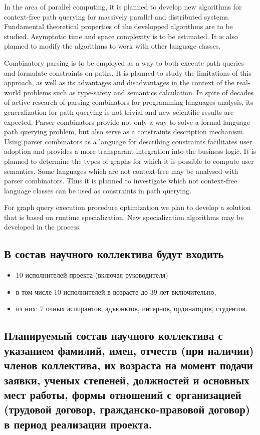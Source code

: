 \documentclass[12pt]{article}  %
\theoremstyle{remark}
\begin{document}
In the area of parallel computing, it is planned to develop new algorithms for context-free path querying for massively parallel and distributed systems.
Fundamental theoretical properties of the developped algorithms are to be studied.
Asymptotic time and space complexity is to be estimated.
It is also planned to modify the algorithms to work with other language classes.

Combinatory parsing is to be employed as a way to both execute path queries and formulate constraints on paths.
It is planned to study the limitations of this approach, as well as its advantages and disadvantages in the context of the real-world problems such as type-safety and semantics calculation.
In spite of decades of active research of parsing combinators for programming languages analysis, its generalization for path querying is not trivial and new scientific results are expected.
Parser combinators provide not only a way to solve a formal language path querying problem, but also serve as a constraints description mechanism.
Using parser combinators as a language for describing constraints facilitates user adoption and provides a more transparant integration into the business logic.
It is planned to determine the types of graphs for which it is possible to compute user semantics.
Some languages which are not context-free may be analysed with parser combinators.
Thus it is planned to investigate which not context-free language classes can be used as constraints in path querying.

For graph query execution procedure optimization we plan to develop a solution that is based on runtime specialization. New specialization algorithms may be developed in the process.

\subsection{В состав научного коллектива будут входить}
%
\begin{itemize}
\item 10 исполнителей проекта (включая руководителя)
\item в том числе 10  исполнителей в возрасте до 39 лет включительно,
\item из них: 7 очных аспирантов, адъюнктов, интернов, ординаторов, студентов.
\end{itemize}

\subsection{Планируемый состав научного коллектива с указанием фамилий, имен, отчеств (при наличии) членов коллектива, их возраста на момент подачи заявки, ученых степеней, должностей и основных мест работы, формы отношений с организацией (трудовой договор, гражданско-правовой договор) в период реализации проекта.}
\end{document}
